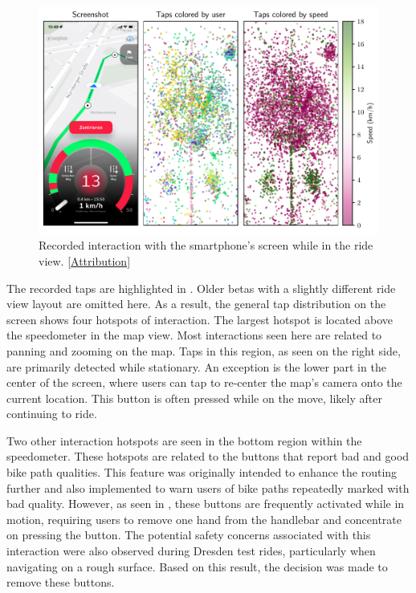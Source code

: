 \begin{figure}[t]
\caption{Recorded interaction with the smartphone's screen while in the ride view. [\hyperref[attribution]{Attribution}]}\label{fig:app-user-interaction}
\includegraphics[width=\linewidth]{images/app-user-interaction.pdf}
\end{figure}

The recorded taps are highlighted in . Older betas with a slightly different ride view layout are omitted here. As a result, the general tap distribution on the screen shows four hotspots of interaction. The largest hotspot is located above the speedometer in the map view. Most interactions seen here are related to panning and zooming on the map. Taps in this region, as seen on the right side, are primarily detected while stationary. An exception is the lower part in the center of the screen, where users can tap to re-center the map's camera onto the current location. This button is often pressed while on the move, likely after continuing to ride.

Two other interaction hotspots are seen in the bottom region within the speedometer. These hotspots are related to the buttons that report bad and good bike path qualities. This feature was originally intended to enhance the routing further and also implemented to warn users of bike paths repeatedly marked with bad quality. However, as seen in , these buttons are frequently activated while in motion, requiring users to remove one hand from the handlebar and concentrate on pressing the button. The potential safety concerns associated with this interaction were also observed during Dresden test rides, particularly when navigating on a rough surface. Based on this result, the decision was made to remove these buttons.

